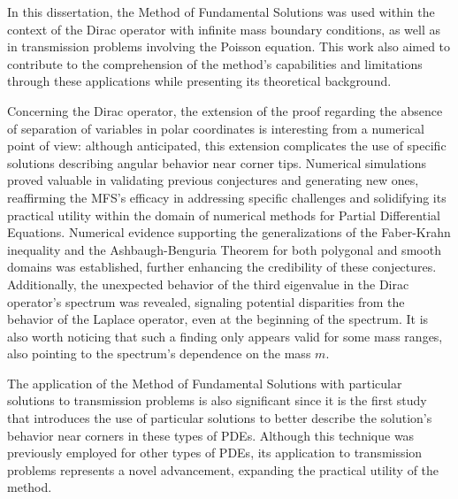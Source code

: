 \label{chap:conclusion}

In this dissertation, the Method of Fundamental Solutions was used within the context of the Dirac operator with infinite mass boundary conditions, as well as in transmission problems involving the Poisson equation. This work also aimed to contribute to the comprehension of the method's capabilities and limitations through these applications while presenting its theoretical background.

Concerning the Dirac operator, the extension of the proof regarding the absence of separation of variables in polar coordinates is interesting from a numerical point of view: although anticipated, this extension complicates the use of specific solutions describing angular behavior near corner tips. Numerical simulations proved valuable in validating previous conjectures and generating new ones, reaffirming the \ac{MFS}'s efficacy in addressing specific challenges and solidifying its practical utility within the domain of numerical methods for Partial Differential Equations. Numerical evidence supporting the generalizations of the Faber-Krahn inequality and the Ashbaugh-Benguria Theorem for both polygonal and smooth domains was established, further enhancing the credibility of these conjectures. Additionally, the unexpected behavior of the third eigenvalue in the Dirac operator's spectrum was revealed, signaling potential disparities from the behavior of the Laplace operator, even at the beginning of the spectrum. It is also worth noticing that such a finding only appears valid for some mass ranges, also pointing to the spectrum's dependence on the mass \(m\).

The application of the Method of Fundamental Solutions with particular solutions to transmission problems is also significant since it is the first study that introduces the use of particular solutions to better describe the solution's behavior near corners in these types of \acp{PDE}. Although this technique was previously employed for other types of \acp{PDE}, its application to transmission problems represents a novel advancement, expanding the practical utility of the method.

